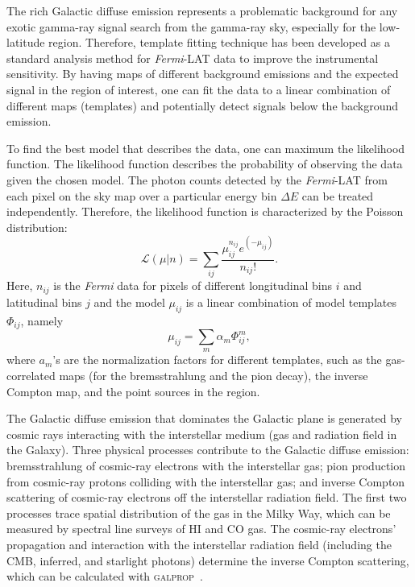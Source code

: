 \documentclass[doublespace,nopageskip]{VTthesis}
\begin{document}
The rich Galactic diffuse emission represents a problematic background for any exotic gamma-ray signal search from the gamma-ray sky, especially for the low-latitude region. Therefore, template fitting technique has been developed as a standard analysis method for \textit{Fermi}-LAT data to improve the instrumental sensitivity. By having maps of different background emissions and the expected signal in the region of interest, one can fit the data to a linear combination of different maps (templates) and potentially detect signals below the background emission.

{To find the best model that describes the data, one can maximum the likelihood function. The likelihood function describes the probability of observing the data given the chosen model.} The photon counts detected by the \textit{Fermi}-LAT from each pixel on the sky map over a particular energy bin $\Delta E$ can be treated independently. Therefore, the likelihood function is characterized by the Poisson distribution:
\begin{equation}
    \mathcal{L}(\mu|n)= \sum_{ij}\frac{\mu_{ij}^{n_{ij}}e^{(-\mu_{ij})}}{n_{ij}!}.
\end{equation}
Here, $n_{ij}$ is the \textit{Fermi} data for pixels of different longitudinal bins $i$ and latitudinal bins $j$ and the model $\mu_{ij}$ is a linear combination of model templates $\Phi_{ij}$, namely
\begin{equation}
    \mu_{ij} = \sum_m \alpha_m \Phi^m_{ij},
\end{equation}
where $a_m$'s are the normalization factors for different templates, such as the gas-correlated maps (for the bremsstrahlung and the pion decay), the inverse Compton map, and the point sources in the region.

The Galactic diffuse emission that dominates the Galactic plane is generated by cosmic rays interacting with the interstellar medium (gas and radiation field in the Galaxy). Three physical processes contribute to the Galactic diffuse emission: bremsstrahlung of cosmic-ray electrons with the interstellar gas; pion production from cosmic-ray protons colliding with the interstellar gas; and inverse Compton scattering of cosmic-ray electrons off the interstellar radiation field. The first two processes trace spatial distribution of the gas in the Milky Way, which can be measured by spectral line surveys of HI and CO gas. The cosmic-ray electrons' propagation and interaction with the interstellar radiation field (including the CMB, inferred, and starlight photons) determine the inverse Compton scattering, which can be calculated with \textsc{galprop}~\cite{2017ApJ...846...67P}.
\end{document}
